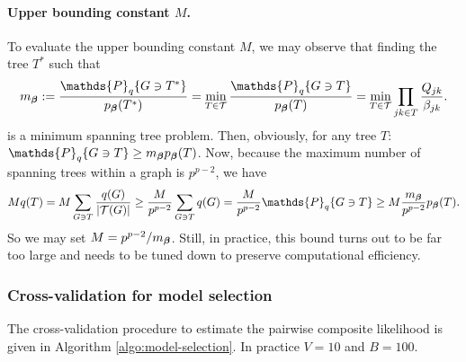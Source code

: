 \paragraph{Upper bounding constant $M$.}
To evaluate the upper bounding constant $M$, we may observe that finding the tree $T^*$ such that
$$
m_\betabf 
:= \frac{\mathds{P}_q\{G \ni T^*\}}{p_\betabf(T^*)}
= \min_{T \in \Tcal} \frac{\mathds{P}_q\{G \ni T\}}{p_\betabf(T)} = \min_{T \in \Tcal} \prod_{jk \in T} \frac{Q_{jk}}{\beta_{jk}}.
$$
is a minimum spanning tree problem. Then, obviously, for any tree $T$: $\mathds{P}_q\{G \ni T\} \geq m_\betabf p_\betabf(T)$.
Now, because the maximum number of spanning trees within a graph is $p^{p-2}$, we have
$$
M q(T)
= M \sum_{G \ni T} \frac{q(G)}{|\Tcal(G)|} 
\geq \frac{M}{p^{p-2}} \sum_{G \ni T} q(G)
= \frac{M}{p^{p-2}} \mathds{P}_q\{G \ni T\}
\geq M \frac{m_\betabf}{p^{p-2}}  p_\betabf(T).
$$
So we may set $M = p^{p-2} / m_{\boldsymbol{\beta}}$. Still, in practice, this bound turns out to be far too large and needs to be tuned down to preserve computational efficiency.

 
\subsubsection{Cross-validation for model selection} \label{eq:cvAlgo}
\label{CV}

The cross-validation procedure to estimate the pairwise composite likelihood is given in Algorithm \ref{algo:model-selection}. In practice $V=10$ and $B = 100$.


